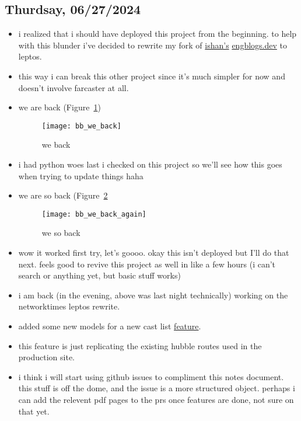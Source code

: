 \subsection*{Thurdsay, 06/27/2024}
\begin{itemize}
    \item i realized that i should have deployed this project from the
        beginning. to help with this blunder i've decided to rewrite my fork of
        \textcolor{blue}{\href{https://github.com/ishan0102/engblogs}{ishan's}}
        \textcolor{blue}{\href{https://engblogs.dev}{engblogs.dev}} to leptos.
    \item this way i can break this other project since it's much simpler for
        now and doesn't involve farcaster at all. 
    \item we are back (Figure~\ref{fig:bb_we_back})
        \begin{figure}[ht]
            \centering
            \texttt{[image: bb\_we\_back]}
            \captionsetup{labelfont=bf, textfont=it}
            \caption{we back}
            \label{fig:bb_we_back}
        \end{figure}
    \item i had python woes last i checked on this project so we'll see how this
        goes when trying to update things haha
    \item we are so back (Figure~\ref{fig:bb_we_back_again}
        \begin{figure}[ht]
            \centering
            \texttt{[image: bb\_we\_back\_again]}
            \captionsetup{labelfont=bf, textfont=it}
            \caption{we so back}
            \label{fig:bb_we_back_again}
        \end{figure}
    \item wow it worked first try, let's goooo. okay this isn't deployed but
        I'll do that next. feels good to revive this project as well in like a
        few hours (i can't search or anything yet, but basic stuff works)

    \clearpage
    \item i am back (in the evening, above was last night technically) working
        on the networktimes leptos rewrite.
    \item added some new models for a new cast list
        \textcolor{blue}{\href{https://github.com/iturner72/thenetworktimes/issues/3}{feature}}.
    \item this feature is just replicating the existing hubble routes used in
        the production site.
    \item i think i will start using github issues to compliment this notes
        document. this stuff is off the dome, and the issue is a more structured
        object. perhaps i can add the relevent pdf pages to the prs once
        features are done, not sure on that yet.
\end{itemize}

